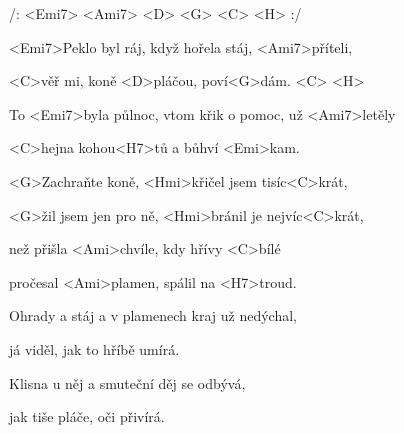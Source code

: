 

/: <Emi7> <Ami7> <D> <G> <C> <H> :/

\zs

<Emi7>Peklo byl ráj, když hořela stáj, <Ami7>příteli,

<C>věř mi, koně <D>pláčou, poví<G>dám. <C> <H>

To <Emi7>byla půlnoc, vtom křik o pomoc, už <Ami7>letěly

<C>hejna kohou<H7>tů a bůhví <Emi>kam.
\ks

\zr
<G>Zachraňte koně, <Hmi>křičel jsem tisíc<C>krát,

<G>žil jsem jen pro ně, <Hmi>bránil je nejvíc<C>krát,

než přišla <Ami>chvíle, kdy hřívy <C>bílé

pročesal <Ami>plamen, spálil na <H7>troud.
\kr


\zs
Ohrady a stáj a v plamenech kraj už nedýchal,

já viděl, jak to hříbě umírá.

Klisna u něj a smuteční děj se odbývá,

jak tiše pláče, oči přivírá.

\ks

\zr
\kr
\kp
